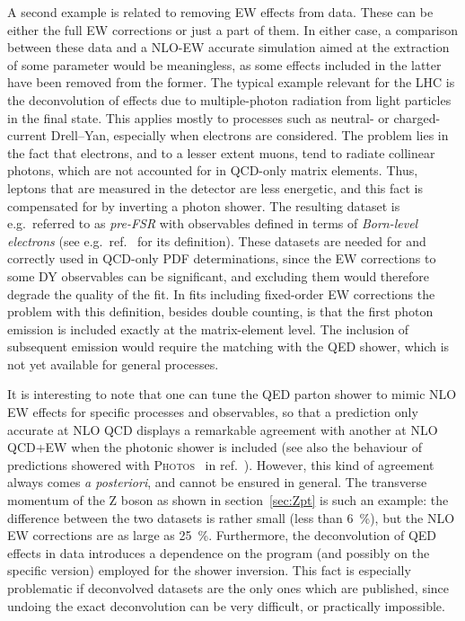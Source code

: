 A second example is related to removing EW effects from data. These can be either the full EW corrections
or just a part of them. In either case, a comparison between these data and a NLO-EW accurate simulation aimed at the extraction of some parameter would be meaningless, as some effects included in the latter
have been removed from the former. The typical example relevant for the LHC is the deconvolution of effects due to multiple-photon radiation
from light particles in the final state. This applies mostly
to processes such as neutral- or charged-current Drell--Yan, especially when electrons are considered. The problem lies in the fact that
 electrons, and to a lesser extent muons, tend to radiate collinear photons, which are not accounted
for in QCD-only matrix elements. Thus, leptons that are measured in the detector are less energetic, and this fact is compensated for
by inverting a photon shower. The resulting dataset is e.g.\ referred to as \emph{pre-FSR} with observables defined in terms of \emph{Born-level electrons} (see e.g.\ ref.~\cite{Aad:2015auj} for its definition).
These datasets are needed for and correctly used in QCD-only PDF determinations, since the EW corrections to some DY observables can be significant, and excluding them would therefore degrade the quality of the fit.
In fits including fixed-order EW corrections the problem with this definition, besides double counting, is that the first photon emission is included exactly at the matrix-element level. The inclusion of
subsequent emission would require the matching with the QED shower, which is not yet available for general processes.

It is interesting
to note that one can tune the QED parton shower to mimic NLO EW effects for specific processes and observables, so that a prediction only accurate at NLO
QCD displays a remarkable agreement with another at NLO QCD+EW when the photonic shower is included (see also the behaviour of predictions showered with
\textsc{Photos}~\cite{Barberio:1990ms,Barberio:1993qi,Golonka:2005pn} in ref.~\cite{CarloniCalame:2016ouw}).
However, this kind of agreement
always comes \emph{a posteriori}, and cannot be ensured in general.
The transverse momentum of the Z boson as shown in section~\ref{sec:Zpt} is such an example: the difference between the two datasets is rather small (less than \SI{6}{\percent}), but the NLO EW corrections are as large as \SI{25}{\percent}.
Furthermore, the deconvolution of QED effects in data introduces a dependence on the program (and possibly on 
the specific version) employed for the shower inversion. 
This fact is especially problematic if deconvolved datasets are the only ones which are published, since undoing the exact deconvolution can be very difficult, or practically impossible.

